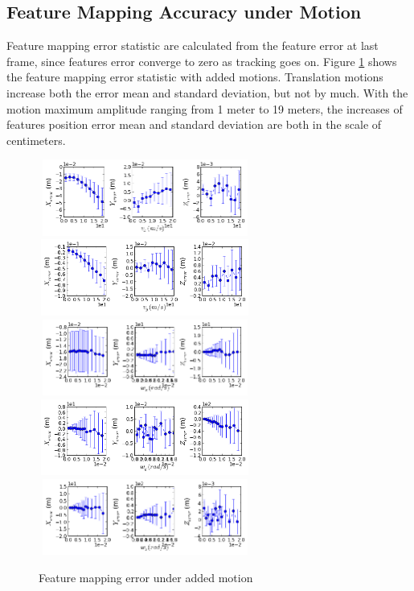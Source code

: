 \subsection{Feature Mapping Accuracy under Motion}\label{sec:featureMotion}
Feature mapping error statistic are calculated from the feature error at last frame, since features error converge to zero as tracking goes on. Figure \ref{fig:simfig20-24} shows the feature mapping error statistic with added motions. Translation motions increase both the error mean and standard deviation, but not by much. With the motion maximum amplitude ranging from 1 meter to 19 meters, the increases of features position error mean and standard deviation are both in the scale of centimeters.

\begin{figure}[h]
  \centering
  \includegraphics[width=7cm, height=2.5cm]{./Figures/SimulationFigures/Figure20.png}
  \includegraphics[width=7cm, height=2.5cm]{./Figures/SimulationFigures/Figure21.png}
  \includegraphics[width=7cm, height=2.5cm]{./Figures/SimulationFigures/Figure22.png}
  \includegraphics[width=7cm, height=2.5cm]{./Figures/SimulationFigures/Figure23.png}
  \includegraphics[width=7cm, height=2.5cm]{./Figures/SimulationFigures/Figure24.png}
  \caption{Feature mapping error under added motion}
  \label{fig:simfig20-24}
\end{figure}

